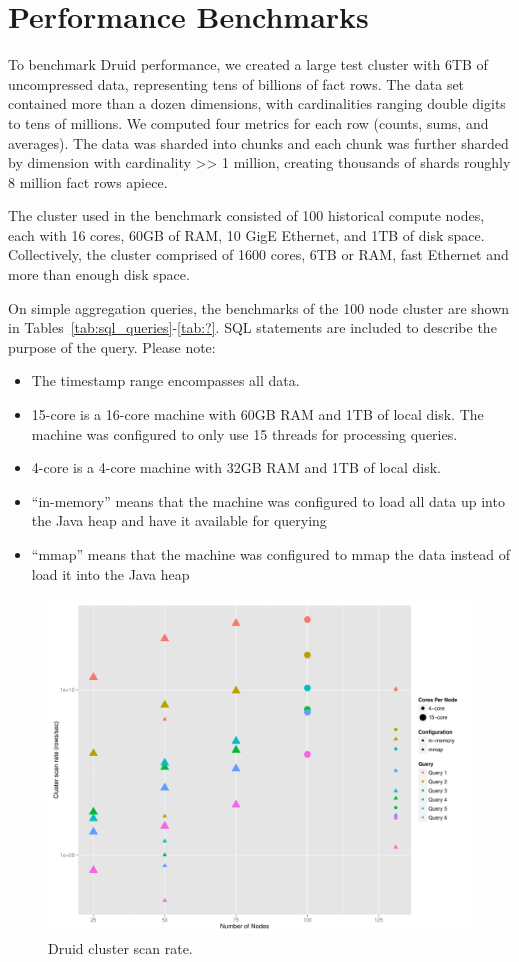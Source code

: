 \documentclass{vldb}
\begin{document}
\section{Performance Benchmarks}
\label{sec:benchmarks}
To benchmark Druid performance, we created a large test cluster with
6TB of uncompressed data, representing tens of billions of fact
rows. The data set contained more than a dozen dimensions, with
cardinalities ranging double digits to tens of millions. We computed
four metrics for each row (counts, sums, and averages). The data was
sharded into chunks and each chunk was further sharded by dimension
with cardinality >> 1 million, creating thousands of shards roughly 8
million fact rows apiece.

The cluster used in the benchmark consisted of 100 historical compute
nodes, each with 16 cores, 60GB of RAM, 10 GigE Ethernet, and 1TB of
disk space. Collectively, the cluster comprised of 1600 cores, 6TB or
RAM, fast Ethernet and more than enough disk space.

On simple aggregation queries, the benchmarks of the 100 node cluster
are shown in Tables~\ref{tab:sql_queries}-\ref{tab:?}. SQL statements are included to describe the
purpose of the query. Please note:
\begin{itemize}
\item The timestamp range encompasses all data.
\item 15-core is a 16-core machine with 60GB RAM and 1TB of local
  disk.  The machine was configured to only use 15 threads for
  processing queries.
\item 4-core is a 4-core machine with 32GB RAM and 1TB of local disk.
\item ``in-memory'' means that the machine was configured to load all
  data up into the Java heap and have it available for querying
\item ``mmap'' means that the machine was configured to mmap the data
  instead of load it into the Java heap
\end{itemize}

\begin{figure}
\centering
\includegraphics[width = 6in]{cluster_scan_rate}
\caption{Druid cluster scan rate.}
\label{fig:cluster_scan_rate}
\end{figure}
\end{document}
